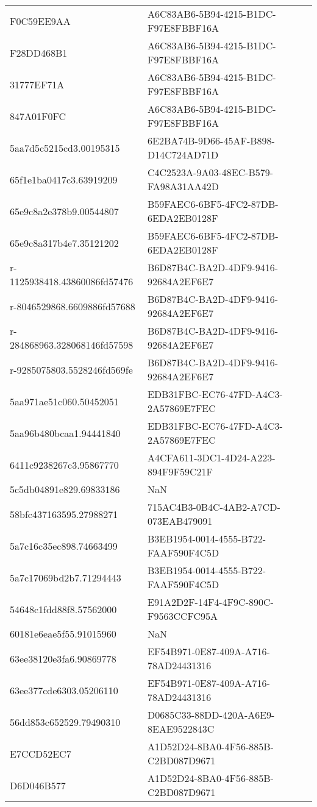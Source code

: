 \begin{tabular}{ll}
F0C59EE9AA & A6C83AB6-5B94-4215-B1DC-F97E8FBBF16A \\
F28DD468B1 & A6C83AB6-5B94-4215-B1DC-F97E8FBBF16A \\
31777EF71A & A6C83AB6-5B94-4215-B1DC-F97E8FBBF16A \\
847A01F0FC & A6C83AB6-5B94-4215-B1DC-F97E8FBBF16A \\
5aa7d5c5215cd3.00195315 & 6E2BA74B-9D66-45AF-B898-D14C724AD71D \\
65f1e1ba0417c3.63919209 & C4C2523A-9A03-48EC-B579-FA98A31AA42D \\
65e9c8a2e378b9.00544807 & B59FAEC6-6BF5-4FC2-87DB-6EDA2EB0128F \\
65e9c8a317b4e7.35121202 & B59FAEC6-6BF5-4FC2-87DB-6EDA2EB0128F \\
r-1125938418.43860086fd57476 & B6D87B4C-BA2D-4DF9-9416-92684A2EF6E7 \\
r-8046529868.6609886fd57688 & B6D87B4C-BA2D-4DF9-9416-92684A2EF6E7 \\
r-284868963.328068146fd57598 & B6D87B4C-BA2D-4DF9-9416-92684A2EF6E7 \\
r-9285075803.5528246fd569fe & B6D87B4C-BA2D-4DF9-9416-92684A2EF6E7 \\
5aa971ae51c060.50452051 & EDB31FBC-EC76-47FD-A4C3-2A57869E7FEC \\
5aa96b480bcaa1.94441840 & EDB31FBC-EC76-47FD-A4C3-2A57869E7FEC \\
6411c9238267c3.95867770 & A4CFA611-3DC1-4D24-A223-894F9F59C21F \\
5c5db04891e829.69833186 & NaN \\
58bfc437163595.27988271 & 715AC4B3-0B4C-4AB2-A7CD-073EAB479091 \\
5a7c16c35ec898.74663499 & B3EB1954-0014-4555-B722-FAAF590F4C5D \\
5a7c17069bd2b7.71294443 & B3EB1954-0014-4555-B722-FAAF590F4C5D \\
54648c1fdd88f8.57562000 & E91A2D2F-14F4-4F9C-890C-F9563CCFC95A \\
60181e6eae5f55.91015960 & NaN \\
63ee38120e3fa6.90869778 & EF54B971-0E87-409A-A716-78AD24431316 \\
63ee377cde6303.05206110 & EF54B971-0E87-409A-A716-78AD24431316 \\
56dd853c652529.79490310 & D0685C33-88DD-420A-A6E9-8EAE9522843C \\
E7CCD52EC7 & A1D52D24-8BA0-4F56-885B-C2BD087D9671 \\
D6D046B577 & A1D52D24-8BA0-4F56-885B-C2BD087D9671 \\

\end{tabular}
